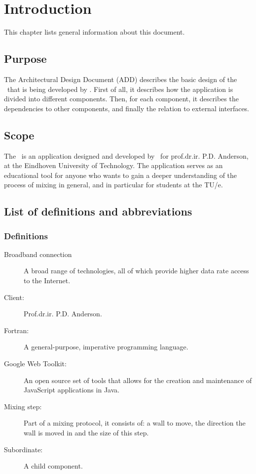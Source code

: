 \chapter{Introduction}

This chapter lists general information about this document.

\section{Purpose}
The Architectural Design Document (ADD) describes the basic design of the \applicationname\ that is being developed by \projectauthor. First of all, it describes how the application is divided into different components. Then, for each component, it describes the dependencies to other components, and finally the relation to external interfaces.

\section{Scope}
The \applicationname\ is an application designed and developed by \projectauthor\ for prof.dr.ir. P.D. Anderson, at the Eindhoven University of Technology. The application serves as an educational tool for anyone who wants to gain a deeper understanding of the process of mixing in general, and in particular for students at the TU/e.

\section{List of definitions and abbreviations}
\subsection{Definitions}
\begin{description}
\item[Broadband connection] A broad range of technologies, all of which provide higher data rate access to the Internet.
\item[Client:] Prof.dr.ir. P.D. Anderson.
\item[Fortran:] A general-purpose, imperative programming language.
\item[Google Web Toolkit:] An open source set of tools that allows for the creation and maintenance of JavaScript applications in Java.
\item[Mixing step:] Part of a mixing protocol, it consists of: a wall to move, the direction the wall is moved in and the size of this step.
\item[Subordinate:] A child component.
\end{description}


